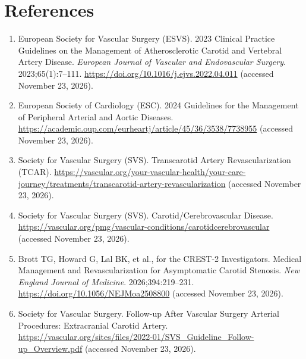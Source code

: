 \section*{References}
\begin{enumerate}
  \item European Society for Vascular Surgery (ESVS). 2023 Clinical Practice Guidelines on the Management of Atherosclerotic Carotid and Vertebral Artery Disease. \textit{European Journal of Vascular and Endovascular Surgery}. 2023;65(1):7--111. \url{https://doi.org/10.1016/j.ejvs.2022.04.011} (accessed November 23, 2026).
  \item European Society of Cardiology (ESC). 2024 Guidelines for the Management of Peripheral Arterial and Aortic Diseases. \url{https://academic.oup.com/eurheartj/article/45/36/3538/7738955} (accessed November 23, 2026).
  \item Society for Vascular Surgery (SVS). Transcarotid Artery Revascularization (TCAR). \url{https://vascular.org/your-vascular-health/your-care-journey/treatments/transcarotid-artery-revascularization} (accessed November 23, 2026).
  \item Society for Vascular Surgery (SVS). Carotid/Cerebrovascular Disease. \url{https://vascular.org/pmg/vascular-conditions/carotidcerebrovascular} (accessed November 23, 2026).
  \item Brott TG, Howard G, Lal BK, et al., for the CREST-2 Investigators. Medical Management and Revascularization for Asymptomatic Carotid Stenosis. \textit{New England Journal of Medicine}. 2026;394:219--231. \url{https://doi.org/10.1056/NEJMoa2508800} (accessed November 23, 2026).
  \item Society for Vascular Surgery. Follow-up After Vascular Surgery Arterial Procedures: Extracranial Carotid Artery. \url{https://vascular.org/sites/files/2022-01/SVS_Guideline_Follow-up_Overview.pdf} (accessed November 23, 2026).
\end{enumerate}

\clearpage
